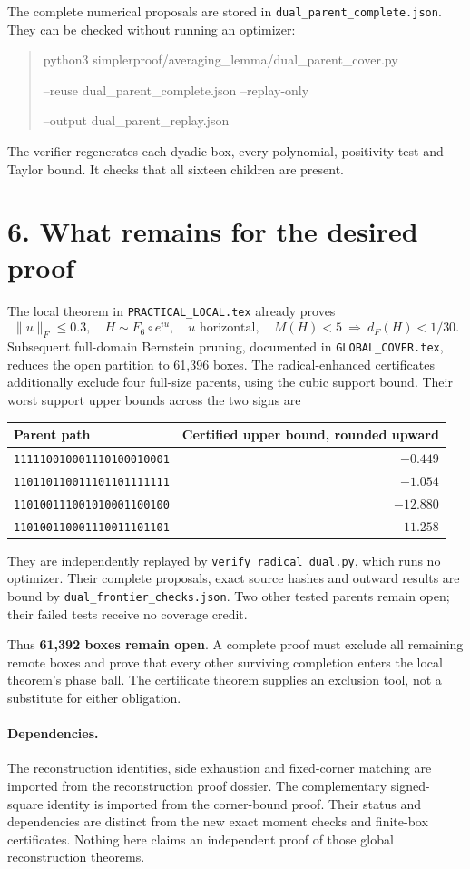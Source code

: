 \documentclass[11pt]{article}
\begin{document}
The complete numerical proposals are stored in
\texttt{dual\_parent\_complete.json}. They can be checked without
running an optimizer:
\begin{quote}\ttfamily\small
python3 simplerproof/averaging\_lemma/dual\_parent\_cover.py\par
\quad --reuse dual\_parent\_complete.json --replay-only\par
\quad --output dual\_parent\_replay.json
\end{quote}
The verifier regenerates each dyadic box, every polynomial, positivity
test and Taylor bound. It checks that all sixteen children are present.

\section*{6. What remains for the desired proof}
The local theorem in \texttt{PRACTICAL\_LOCAL.tex} already proves
\[
 \|u\|_F\le0.3,\quad H\sim F_6\circ e^{iu},\quad
 u\text{ horizontal},\quad M(H)<5
 \ \Longrightarrow\ d_F(H)<1/30.
\]
Subsequent full-domain Bernstein pruning, documented in
\texttt{GLOBAL\_COVER.tex}, reduces the open partition to 61,396 boxes.
The radical-enhanced certificates additionally exclude four full-size
parents, using the cubic support bound. Their worst support upper
bounds across the two signs are
\begin{center}\small
\begin{tabular}{lr}\toprule
Parent path & Certified upper bound, rounded upward\\\midrule
\texttt{111110010001110100010001}&$-0.449$\\
\texttt{110110110011101101111111}&$-1.054$\\
\texttt{110100111001010001100100}&$-12.880$\\
\texttt{110100110001110011101101}&$-11.258$\\\bottomrule
\end{tabular}
\end{center}
They are independently replayed by \texttt{verify\_radical\_dual.py},
which runs no optimizer. Their complete proposals, exact source hashes
and outward results are bound by \texttt{dual\_frontier\_checks.json}.
Two other tested parents remain open; their failed tests receive no
coverage credit.

Thus \textbf{61,392 boxes remain open}. A complete proof must exclude
all remaining remote boxes and prove that every other surviving
completion enters the local theorem's phase ball. The certificate
theorem supplies an exclusion tool, not a substitute for either obligation.

\paragraph{Dependencies.}
The reconstruction identities, side exhaustion and fixed-corner
matching are imported from the reconstruction proof dossier. The
complementary signed-square identity is imported from the corner-bound
proof. Their status and dependencies are distinct from the new exact
moment checks and finite-box certificates. Nothing here claims an
independent proof of those global reconstruction theorems.
\end{document}
